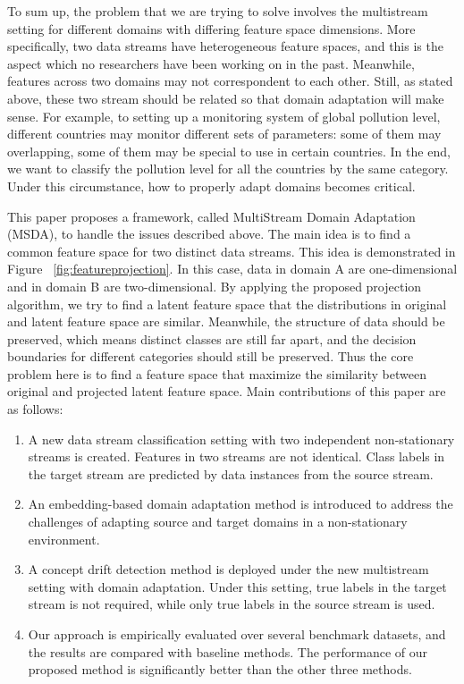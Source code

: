 To sum up, the problem that we are trying to solve involves the multistream setting for different domains with differing feature space dimensions. 
More specifically, two data streams have heterogeneous feature spaces, and this is the aspect which no researchers have been working on in the past. 
Meanwhile, features across two domains may not correspondent to each other. Still, as stated above, these two stream should be related so that domain adaptation will make sense. 
For example, to setting up a monitoring system of global pollution level, different countries may monitor different sets of parameters: some of them may overlapping, some of them may be special to use in certain countries. 
In the end, we want to classify the pollution level for all the countries by the same category. Under this circumstance, how to properly adapt domains becomes critical.


This paper proposes a framework, called MultiStream Domain Adaptation (MSDA), to handle the issues described above. The
main idea is to find a common feature space for two distinct data streams. This idea is demonstrated in Figure ~\ref{fig:featureprojection}. In this case, data in domain A are one-dimensional and in domain B are two-dimensional. By applying the proposed projection algorithm, we
try to find a latent feature space that the distributions in original and latent feature space are similar. 
Meanwhile, the structure of data should be preserved, which means distinct classes are still far
apart, and the decision boundaries for different categories should still be preserved.
Thus the core problem here is to find a feature space that maximize the similarity between
original and projected latent feature space. Main contributions of this paper are as follows:

\begin{enumerate}
\item A new data stream classification setting with two independent non-stationary streams is created. Features in two streams are not identical. Class labels in the target stream are predicted by data instances from the source stream.
\item An embedding-based domain adaptation method is introduced to address the challenges of adapting source and target domains in a non-stationary environment.
\item A concept drift detection method is deployed under the new multistream setting with domain adaptation. Under this setting, true labels in the target stream is not required, while only true labels in the source stream is used. 
\item Our approach is empirically evaluated over several benchmark datasets, and the results are compared with baseline methods. The performance of our proposed method is significantly better than the other three methods.
\end{enumerate}

